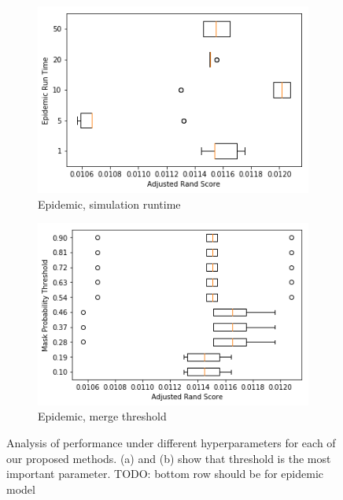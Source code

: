 \documentclass[twocolumn]{article}
\newcommand{\todo}[1]{}
\renewcommand{\todo}[1]{{\color{red} TODO: {#1}}}
\newcommand{\figlab}[1]{\label{fig:#1}}
\begin{document}
\begin{figure}[t!]
  \begin{subfigure}{0.49\linewidth}
    \includegraphics[width=\linewidth]{figs/epidemic_run.png}
    \caption{Epidemic, simulation runtime}
  \end{subfigure}
  \begin{subfigure}{0.49\linewidth}
    \includegraphics[width=\linewidth]{figs/epidemic_thresh.png}
    \caption{Epidemic, merge threshold}
  \end{subfigure}

  \caption{
    Analysis of performance under different hyperparameters for each of our proposed methods. (a) and (b) show that threshold
    is the most important parameter. \todo{bottom row should be for epidemic model}
  }
  \figlab{ab_only}

\end{figure}
\end{document}
